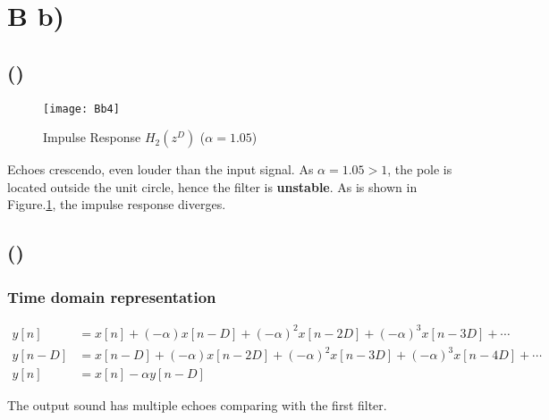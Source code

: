 \documentclass{article}
\newenvironment{homeworkProblem}[1]{
	\section*{#1}
	}{
}
\newenvironment{homeworkSection}[1]{
	\subsection*{#1}
	}{
}
\begin{document}
\begin{homeworkProblem}{B b)}
\begin{homeworkSection}{()}
\begin{figure}[H]
\centering
\texttt{[image: Bb4]}
\caption{Impulse Response $H_2(z^D)$ ($\alpha=1.05$)}
\label{Bb4}
\end{figure}

Echoes crescendo, even louder than the input signal. As $\alpha = 1.05 > 1$, the pole is located outside the unit circle, hence the filter is \textbf{unstable}. As is shown in Figure.\ref{Bb4}, the impulse response diverges.

\end{homeworkSection}


\begin{homeworkSection}{()}

\subsubsection*{Time domain representation}
\begin{align*}
y[n] &= x[n] + (-\alpha) x[n-D] + (-\alpha)^2 x[n-2D] + (-\alpha)^3 x[n-3D] + \cdots\\
y[n-D] &= x[n-D] + (-\alpha) x[n-2D] + (-\alpha)^2 x[n-3D] + (-\alpha)^3 x[n-4D] + \cdots\\
y[n] &= x[n] - \alpha y[n-D]
\end{align*}

The output sound has multiple echoes comparing with the first filter.
\end{homeworkSection}


\end{homeworkProblem}

\end{document}
